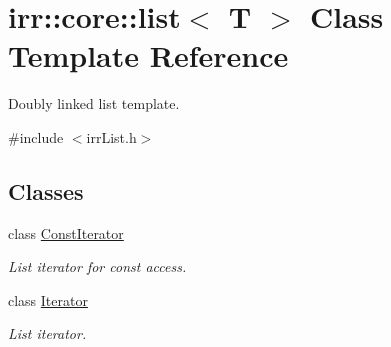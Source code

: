 \hypertarget{classirr_1_1core_1_1list}{}\section{irr\+:\+:core\+:\+:list$<$ T $>$ Class Template Reference}
\label{classirr_1_1core_1_1list}


Doubly linked list template.  




{\ttfamily \#include $<$irr\+List.\+h$>$}

\subsection*{Classes}
\begin{DoxyCompactItemize}
\item 
class \hyperlink{classirr_1_1core_1_1list_1_1ConstIterator}{Const\+Iterator}
\begin{DoxyCompactList}\small\item\em List iterator for const access. \end{DoxyCompactList}\item 
class \hyperlink{classirr_1_1core_1_1list_1_1Iterator}{Iterator}
\begin{DoxyCompactList}\small\item\em List iterator. \end{DoxyCompactList}\end{DoxyCompactItemize}
